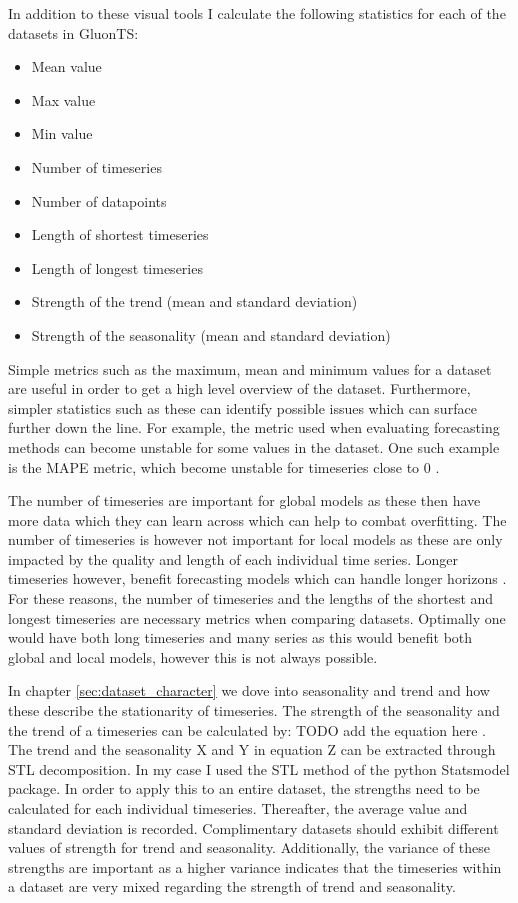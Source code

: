 In addition to these visual tools I calculate the following statistics for each of the datasets in GluonTS:

\begin{itemize}
\item Mean value
\item Max value
\item Min value
\item Number of timeseries
\item Number of datapoints
\item Length of shortest timeseries
\item Length of longest timeseries
\item Strength of the trend (mean and standard deviation)
\item Strength of the seasonality (mean and standard deviation)
\end{itemize}

Simple metrics such as the maximum, mean and minimum values for a dataset are useful in order to get a high level overview of the dataset. Furthermore, simpler statistics such as these can identify possible issues which can surface further down the line. For example, the metric used when evaluating forecasting methods can become unstable for some values in the dataset. One such example is the MAPE metric, which become unstable for timeseries close to 0 \cite{hyndman_forecasting_3rd}. 

The number of timeseries are important for global models as these then have more data which they can learn across which can help to combat overfitting. The number of timeseries is however not important for local models as these are only impacted by the quality and length of each individual time series. Longer timeseries however, benefit forecasting models which can handle longer horizons \cite{makridakis_m4_2020}. For these reasons, the number of timeseries and the lengths of the shortest and longest timeseries are necessary metrics when comparing datasets. Optimally one would have both long timeseries and many series as this would benefit both global and local models, however this is not always possible.

In chapter \ref{sec:dataset_character} we dove into seasonality and trend and how these describe the stationarity of timeseries. The strength of the seasonality and the trend of a timeseries can be calculated by: TODO add the equation here \cite{hyndman_forecasting_3rd}. The trend and the seasonality X and Y in equation Z can be extracted through STL decomposition. In my case I used the STL method of the python Statsmodel package. In order to apply this to an entire dataset, the strengths need to be calculated for each individual timeseries. Thereafter, the average value and standard deviation is recorded. Complimentary datasets should exhibit different values of strength for trend and seasonality. Additionally, the variance of these strengths are important as a higher variance indicates that the timeseries within a dataset are very mixed regarding the strength of trend and seasonality. 

